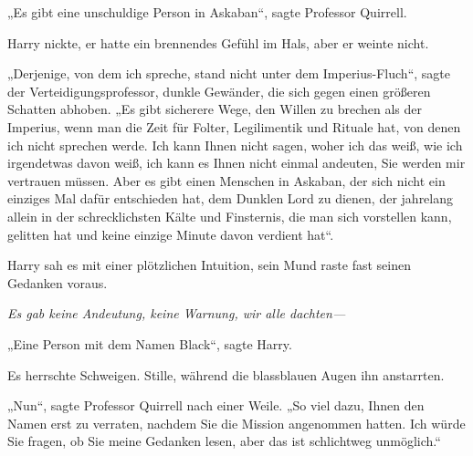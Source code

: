 „Es gibt eine unschuldige Person in Askaban“, sagte Professor Quirrell.

Harry nickte, er hatte ein brennendes Gefühl im Hals, aber er weinte nicht.

„Derjenige, von dem ich spreche, stand nicht unter dem Imperius-Fluch“, sagte der Verteidigungsprofessor, dunkle Gewänder, die sich gegen einen größeren Schatten abhoben.
„Es gibt sicherere Wege, den Willen zu brechen als der Imperius, wenn man die Zeit für Folter, Legilimentik und Rituale hat, von denen ich nicht sprechen werde. Ich kann Ihnen nicht sagen, woher ich das weiß, wie ich irgendetwas davon weiß, ich kann es Ihnen nicht einmal andeuten, Sie werden mir vertrauen müssen. Aber es gibt einen Menschen in Askaban, der sich nicht ein einziges Mal dafür entschieden hat, dem Dunklen Lord zu dienen, der jahrelang allein in der schrecklichsten Kälte und Finsternis, die man sich vorstellen kann, gelitten hat und keine einzige Minute davon verdient hat“.

Harry sah es mit einer plötzlichen Intuition, sein Mund raste fast seinen Gedanken voraus.

\emph{Es gab keine Andeutung, keine Warnung, wir alle dachten—}

„Eine Person mit dem Namen Black“, sagte Harry.

Es herrschte Schweigen. Stille, während die blassblauen Augen ihn anstarrten.

„Nun“, sagte Professor Quirrell nach einer Weile.
„So viel dazu, Ihnen den Namen erst zu verraten, nachdem Sie die Mission angenommen hatten. Ich würde Sie fragen, ob Sie meine Gedanken lesen, aber das ist schlichtweg unmöglich.“

